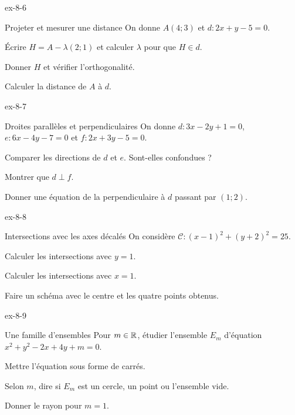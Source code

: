 \clearpage
{}
\begin{blocLivre}{ex-8-6}
\begin{exercice}[2]{Projeter et mesurer une distance}
On donne $A(4;3)$ et $d:2x+y-5=0$.\begin{questions}
\item Écrire $H=A-\lambda(2;1)$ et calculer $\lambda$ pour que $H\in d$.
\item Donner $H$ et vérifier l’orthogonalité.
\item Calculer la distance de $A$ à $d$.
\end{questions}

\label{figgeo-08-06-ex}
\end{exercice}
\end{blocLivre}
\begin{blocLivre}{ex-8-7}
\begin{exercice}[2]{Droites parallèles et perpendiculaires}
On donne $d:3x-2y+1=0$, $e:6x-4y-7=0$ et $f:2x+3y-5=0$.\begin{questions}
\item Comparer les directions de $d$ et $e$. Sont-elles confondues ?
\item Montrer que $d\perp f$.
\item Donner une équation de la perpendiculaire à $d$ passant par $(1;2)$.
\end{questions}

\label{figgeo-08-07-ex}
\end{exercice}
\end{blocLivre}
\begin{blocLivre}{ex-8-8}
\begin{exercice}[2]{Intersections avec les axes décalés}
On considère $\mathcal C:(x-1)^2+(y+2)^2=25$.\begin{questions}
\item Calculer les intersections avec $y=1$.
\item Calculer les intersections avec $x=1$.
\item Faire un schéma avec le centre et les quatre points obtenus.
\end{questions}

\label{figgeo-08-08-ex}
\end{exercice}
\end{blocLivre}
\begin{blocLivre}{ex-8-9}
\begin{exercice}[2]{Une famille d'ensembles}
Pour $m\in\mathbb{R}$, étudier l’ensemble $E_m$ d’équation $x^2+y^2-2x+4y+m=0$.\begin{questions}
\item Mettre l’équation sous forme de carrés.
\item Selon $m$, dire si $E_m$ est un cercle, un point ou l’ensemble vide.
\item Donner le rayon pour $m=1$.
\end{questions}

\label{figgeo-08-09-ex}
\end{exercice}
\end{blocLivre}

